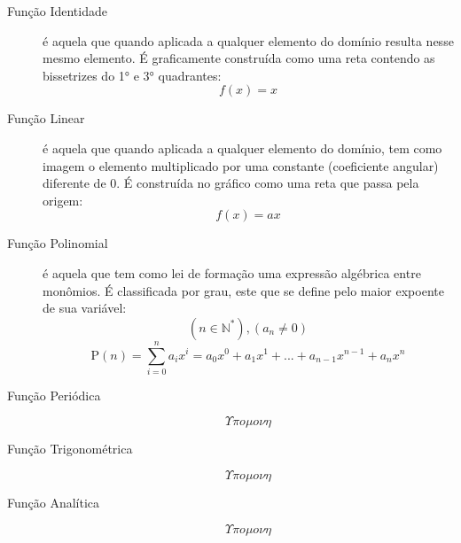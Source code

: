         \begin{description}
            \item[Função Identidade] é aquela que quando aplicada a qualquer elemento do domínio resulta nesse mesmo elemento. É graficamente construída como uma reta contendo as bissetrizes do 1° e 3° quadrantes:
            \[ f(x) = x \]
            \begin{center}
            \end{center}
            \item[Função Linear] é aquela que quando aplicada a qualquer elemento do domínio, tem como imagem o elemento multiplicado por uma constante (coeficiente angular) diferente de 0. É construída no gráfico como uma reta que passa pela origem:
            \[ f(x) = ax \]
            \begin{center}
            \end{center}
            \item[Função Polinomial] é aquela que tem como lei de formação uma expressão algébrica entre monômios. É classificada por grau, este que se define pelo maior expoente de sua variável:
            \[ (n \in \mathbb{N}^*), (a_n \neq 0) \]
            \[ \mathrm{P}(n) = \displaystyle\sum_{i=0}^{n} {a_{i}x^{i}} = a_{0}x^{0} + a_{1}x^{1} + ... + a_{n-1}x^{n-1} + a_{n}x^{n} \]
            \item[Função Periódica] \[ \Upsilon \pi o \mu o \nu \eta \]
            \item[Função Trigonométrica] \[ \Upsilon \pi o \mu o \nu \eta \]
            \item[Função Analítica] \[ \Upsilon \pi o \mu o \nu \eta \]
        \end{description}
